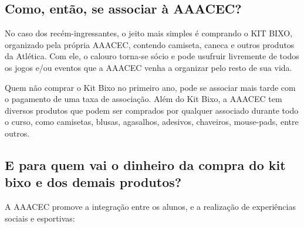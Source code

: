 \subsection{Como, então, se associar à AAACEC?}

No caso dos recém-ingressantes, o jeito mais simples é comprando o KIT BIXO,
organizado pela própria AAACEC, contendo camiseta, caneca e outros produtos da
Atlética. Com ele, o calouro torna-se sócio e pode usufruir livremente de todos
os jogos e/ou eventos que a AAACEC venha a organizar pelo resto de sua vida.

Quem não comprar o Kit Bixo no primeiro ano, pode se associar mais tarde com o
pagamento de uma taxa de associação. Além do Kit Bixo, a AAACEC tem diversos
produtos que podem ser comprados por qualquer associado durante todo o curso,
como camisetas, blusas, agasalhos, adesivos, chaveiros, mouse-pads, entre
outros.

\subsection{E para quem vai o dinheiro da compra do kit bixo e dos demais produtos?}

A AAACEC promove a integração entre os alunos, e a realização de experiências
sociais e esportivas:

